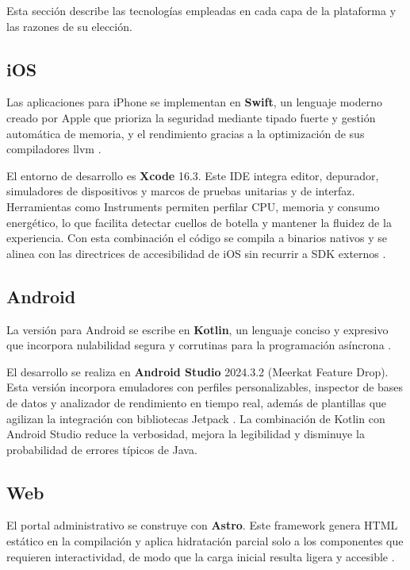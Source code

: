\begin{large}
Esta sección describe las tecnologías empleadas en cada capa de la plataforma y las razones de su elección.

\subsection*{iOS}
Las aplicaciones para iPhone se implementan en \textbf{Swift}, un lenguaje moderno creado por Apple que prioriza la seguridad mediante tipado fuerte y gestión automática de memoria, y el rendimiento gracias a la optimización de sus compiladores \gls{llvm} \cite{swift_lang2025}.

El entorno de desarrollo es \textbf{Xcode} 16.3. Este IDE integra editor, depurador, simuladores de dispositivos y marcos de pruebas unitarias y de interfaz. Herramientas como Instruments permiten perfilar CPU, memoria y consumo energético, lo que facilita detectar cuellos de botella y mantener la fluidez de la experiencia. Con esta combinación el código se compila a binarios nativos y se alinea con las directrices de accesibilidad de iOS sin recurrir a SDK externos \cite{xcode16_3}.

\subsection*{Android}
La versión para Android se escribe en \textbf{Kotlin}, un lenguaje conciso y expresivo que incorpora nulabilidad segura y corrutinas para la programación asíncrona \cite{kotlin_lang2025}.

El desarrollo se realiza en \textbf{Android Studio} 2024.3.2 (Meerkat Feature Drop). Esta versión incorpora emuladores con perfiles personalizables, inspector de bases de datos y analizador de rendimiento en tiempo real, además de plantillas que agilizan la integración con bibliotecas Jetpack \cite{as2024_3_2}. La combinación de Kotlin con Android Studio reduce la verbosidad, mejora la legibilidad y disminuye la probabilidad de errores típicos de Java.

\subsection*{Web}
El portal administrativo se construye con \textbf{Astro}. Este framework genera HTML estático en la compilación y aplica hidratación parcial solo a los componentes que requieren interactividad, de modo que la carga inicial resulta ligera y accesible \cite{astro_docs2025}.


\end{large}
